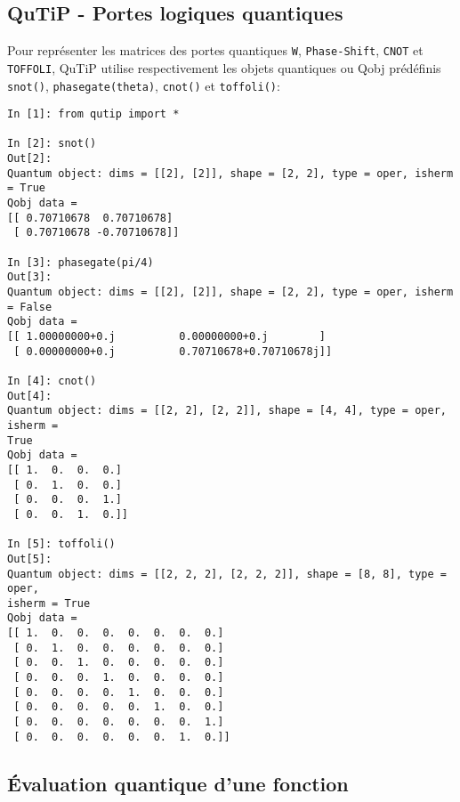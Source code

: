 \subsection{QuTiP - Portes logiques quantiques}

Pour représenter les matrices des portes quantiques \texttt{W}, 
\texttt{Phase-Shift}, \texttt{CNOT} et \texttt{TOFFOLI}, QuTiP utilise 
respectivement les objets quantiques ou Qobj prédéfinis \texttt{snot()}, 
\texttt{phasegate(theta)}, \texttt{cnot()} et \texttt{toffoli()}:
\begin{lstlisting}
In [1]: from qutip import *

In [2]: snot()
Out[2]: 
Quantum object: dims = [[2], [2]], shape = [2, 2], type = oper, isherm = True
Qobj data =
[[ 0.70710678  0.70710678]
 [ 0.70710678 -0.70710678]]

In [3]: phasegate(pi/4)
Out[3]: 
Quantum object: dims = [[2], [2]], shape = [2, 2], type = oper, isherm = False
Qobj data =
[[ 1.00000000+0.j          0.00000000+0.j        ]
 [ 0.00000000+0.j          0.70710678+0.70710678j]]

In [4]: cnot()
Out[4]: 
Quantum object: dims = [[2, 2], [2, 2]], shape = [4, 4], type = oper, isherm = 
True
Qobj data =
[[ 1.  0.  0.  0.]
 [ 0.  1.  0.  0.]
 [ 0.  0.  0.  1.]
 [ 0.  0.  1.  0.]]

In [5]: toffoli()
Out[5]: 
Quantum object: dims = [[2, 2, 2], [2, 2, 2]], shape = [8, 8], type = oper, 
isherm = True
Qobj data =
[[ 1.  0.  0.  0.  0.  0.  0.  0.]
 [ 0.  1.  0.  0.  0.  0.  0.  0.]
 [ 0.  0.  1.  0.  0.  0.  0.  0.]
 [ 0.  0.  0.  1.  0.  0.  0.  0.]
 [ 0.  0.  0.  0.  1.  0.  0.  0.]
 [ 0.  0.  0.  0.  0.  1.  0.  0.]
 [ 0.  0.  0.  0.  0.  0.  0.  1.]
 [ 0.  0.  0.  0.  0.  0.  1.  0.]]
\end{lstlisting}


\subsection{Évaluation quantique d'une fonction}

